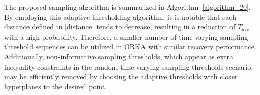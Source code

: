 \documentclass[12pt,draftcls,onecolumn]{IEEEtran}
\begin{document}
The proposed sampling algorithm is summarized in Algorithm~\ref{algorithm_20}. By employing this adaptive thresholding algorithm, it is notable that each distance defined in \eqref{distance} tends to decrease, resulting in a reduction of $T_{\mathrm{ave}}$ with a high probability. Therefore, a smaller number of time-varying sampling threshold sequences can be utilized in ORKA with similar recovery performance. Additionally, non-informative sampling thresholds, which appear as extra inequality constraints in the random time-varying sampling thresholds scenario, may be efficiently removed by choosing the adaptive thresholds with closer hyperplanes to the desired point.
   
\end{document}
